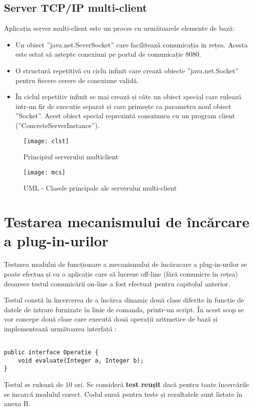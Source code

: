\subsection{Server TCP/IP multi-client}
\par Aplicația server multi-client este un proces cu următoarele elemente de bază:
\begin{itemize}
\item Un obiect ”java.net.SeverSocket” care facilitează comunicația in rețea. Acesta este setat să aștepte conexiuni pe portul de comunicație 8080.
\item O structură repetitivă cu ciclu infinit care crează obiecte ”java.net.Socket” pentru fiecere cerere de conexiune validă. 
\item În ciclul repetitiv infinit se mai crează și câte un obiect special care rulează intr-un fir de execuție separat și care primește ca parametru noul obiect ”Socket”. Acest obiect special reprezintă coneziunea cu un program client (”ConcreteServerInstance”).
\end{itemize}
\begin{figure}[h]
    \centering
    \texttt{[image: clst]}
    \caption{Principiul serverului multiclient}
    \label{fig:imag8}
\end{figure}
\begin{figure}[h]
    \centering
    \texttt{[image: mcs]}
    \caption{UML - Clasele principale ale serverului multi-client}
    \label{fig:imag9}
\end{figure}

\section{Testarea mecanismului de încărcare a plug-in-urilor}
\par Testarea modului de funcționare a mecanismului de încăracare a plug-in-urilor se poate efectua și cu o aplicație care să lucreze off-line (fără comunicre în rețea) deoarece testul comunicării on-line a fost efectuat pentru capitolul anterior.
\par Testul constă în încercerea de a încărca dinamic două clase diferite în funcție de datele de intrare furnizate în linie de comanda, printr-un script. În acest scop se vor concepe două clase care execută două operații aritmetice de bază și implementează următoarea interfață :
\begin{verbatim}

public interface Operatie {
	void evaluate(Integer a, Integer b);
}

\end{verbatim}

\par Testul se rulează de 10 ori. Se consideră \textbf{test reușit} dacă pentru toate încercările se incarcă modulul corect. Codul sursă pentru teste și rezultatele sunt listate în anexa B.
